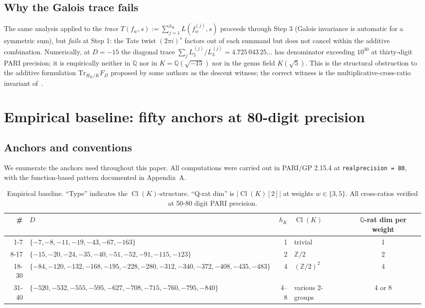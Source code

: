 \documentclass[11pt]{amsart}
\theoremstyle{definition}
\theoremstyle{remark}
\DeclareMathOperator{\Cl}{Cl}
\newcommand{\Q}{\mathbb{Q}}
\newcommand{\Z}{\mathbb{Z}}
\newcommand{\HK}{H_K}
\begin{document}
\subsection{Why the Galois trace fails}\label{ss:trace-fails}
The same analysis applied to the \emph{trace}
$T(f_w, s) := \sum_{j=1}^{h_K} L(f_w^{(j)}, s)$ proceeds through
Step 3 (Galois invariance is automatic for a symmetric sum), but
\emph{fails} at Step 1: the Tate twist $(2\pi i)^s$ factors out of
each summand but does not cancel within the additive
combination. Numerically, at $D = -15$ the diagonal trace
$\sum_j L_5^{(j)}/L_3^{(j)} = 4.725\,043\,25\ldots$ has denominator
exceeding $10^{30}$ at thirty-digit PARI precision; it is empirically
neither in $\Q$ nor in $K = \Q(\sqrt{-15})$ nor in the genus field
$K(\sqrt 5)$. This is the structural obstruction to the additive
formulation $\mathrm{Tr}_{\HK/K} F_D$ proposed by some authors as the
descent witness; the correct witness is the
multiplicative-cross-ratio invariant of~.

\section{Empirical baseline: fifty anchors at 80-digit precision}
\label{sec:empirical}

\subsection{Anchors and conventions}
We enumerate the anchors used throughout this paper. All computations
were carried out in PARI/GP 2.15.4 at \texttt{realprecision = 80}, with
the function-based pattern documented in Appendix~A.

\begin{table}[h!]
\centering
\caption{Empirical baseline. ``Type'' indicates the
$\Cl(K)$-structure. ``Q-rat dim'' is $|\Cl(K)[2]|$ at weights $w \in
\{3, 5\}$. All cross-ratios verified at 50-80 digit PARI precision.}
\label{tab:anchors}
\begin{tabular}{rlrlc}
\toprule
\# & $D$ & $h_K$ & $\Cl(K)$ & $\Q$-rat dim per weight \\
\midrule
1-7 & $\{-7,-8,-11,-19,-43,-67,-163\}$ & 1 & trivial & 1 \\
8-17 & $\{-15,-20,-24,-35,-40,-51,-52,-91,-115,-123\}$ & 2 & $\Z/2$ & 2 \\
18-30 & $\{-84,-120,-132,-168,-195,-228,-280,-312,-340,-372,-408,-435,-483\}$
& 4 & $(\Z/2)^2$ & 4 \\
31-40 & $\{-520,-532,-555,-595,-627,-708,-715,-760,-795,-840\}$ & 4--8 & various 2-groups & 4 or 8 \\
\bottomrule
\end{tabular}
\end{table}
\end{document}
